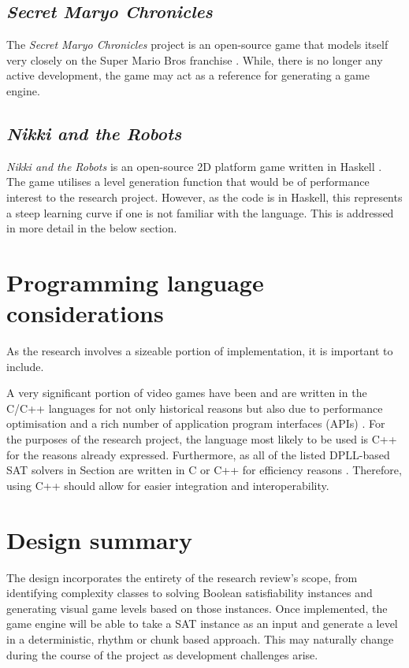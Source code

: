 \documentclass[11pt, a4paper, oneside]{report} %
\begin{document}
\subsection{\textit{Secret Maryo Chronicles}}

The \textit{Secret Maryo Chronicles} project is an open-source game that models
itself very closely on the Super Mario Bros franchise \cite{supermaryo}. While,
there is no longer any active development, the game may act as a reference for
generating a game engine.

\subsection{\textit{Nikki and the Robots}}

\textit{Nikki and the Robots} is an open-source 2D platform game written in
Haskell \cite{nikki}. The game utilises a level generation function that would
be of performance interest to the research project. However, as the code is in
Haskell, this represents a steep learning curve if one is not familiar with the
language. This is addressed in more detail in the below section.


\section{Programming language considerations}

As the research involves a sizeable portion of implementation, it is important
to include.

A very significant portion of video games have been and are written in the C/C++
languages for not only historical reasons but also due to performance
optimisation and a rich number of application program interfaces (APIs)
\cite{Gregory:2009}. For the purposes of the research project, the language most
likely to be used is C++ for the reasons already expressed. Furthermore, as all
of the listed DPLL-based SAT solvers in Section are written in C or C++ for
efficiency reasons \cite{zhang2002quest}. Therefore, using C++ should allow for
easier integration and interoperability.

\section{Design summary}

The design incorporates the entirety of the research review's scope, from
identifying complexity classes to solving Boolean satisfiability instances and
generating visual game levels based on those instances. Once implemented, the
game engine will be able to take a SAT instance as an input and generate a level
in a deterministic, rhythm or chunk based approach. This may naturally change
during the course of the project as development challenges arise.
\end{document}
